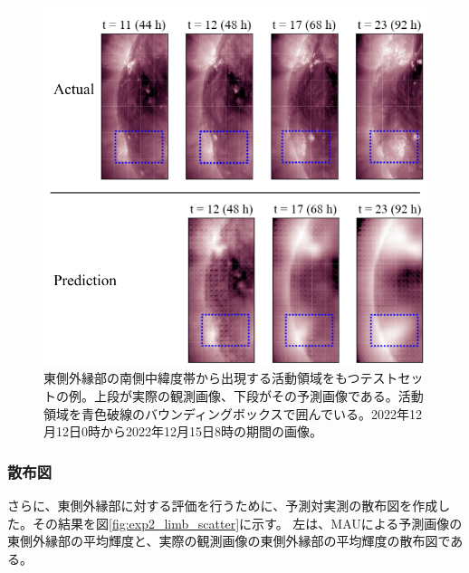         \begin{figure}[htbp]
          \centering
          \includegraphics[width=\textwidth]{figures/exp2/limb_sample_12_caption.jpg}
          \caption{東側外縁部の南側中緯度帯から出現する活動領域をもつテストセットの例。上段が実際の観測画像、下段がその予測画像である。活動領域を青色破線のバウンディングボックスで囲んでいる。2022年12月12日0時から2022年12月15日8時の期間の画像。}
          \label{fig:exp2_limb_example_2}
        \end{figure}

      \subsubsection{散布図}
        さらに、東側外縁部に対する評価を行うために、予測対実測の散布図を作成した。その結果を図\ref{fig:exp2_limb_scatter}に示す。
        左は、MAUによる予測画像の東側外縁部の平均輝度と、実際の観測画像の東側外縁部の平均輝度の散布図である。

